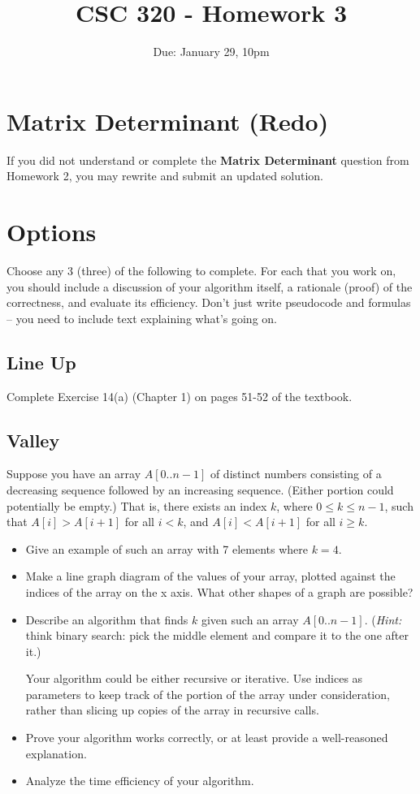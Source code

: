 \documentclass[12pt]{article}
\title{CSC 320 - Homework 3}
\author{}
\date{Due: January 29, 10pm}
\begin{document}
{\small \tableofcontents}

\section{Matrix Determinant (Redo)}

If you did not understand or complete the \textbf{Matrix Determinant} question from Homework 2, you may rewrite and submit an updated solution.

\section{Options}

Choose any 3 (three) of the following to complete. For each that you work on, you should include a discussion of your algorithm itself, a rationale (proof) of the correctness, and evaluate its efficiency. Don't just write pseudocode and formulas -- you need to include text explaining what's going on.

\subsection{Line Up}

Complete Exercise 14(a) (Chapter 1) on pages 51-52 of the textbook.

\subsection{Valley}

Suppose you have an array $A[0..n-1]$ of distinct numbers consisting of a decreasing sequence followed by an increasing sequence. (Either portion could potentially be empty.) That is, there exists an index $k$, where $0 \leq k \leq n-1$, such that $A[i] > A[i+1]$ for all $i < k$, and $A[i] < A[i+1]$ for all $i \geq k$.

\begin{itemize}
    \item Give an example of such an array with 7 elements where $k = 4$.
    
    \item Make a line graph diagram of the values of your array, plotted against the indices of the array on the x axis. What other shapes of a graph are possible?

    \item Describe an algorithm that finds $k$ given such an array $A[0..n-1]$. (\emph{Hint:} think binary search: pick the middle element and compare it to the one after it.)
    
    Your algorithm could be either recursive or iterative. Use indices as parameters to keep track of the portion of the array under consideration, rather than slicing up copies of the array in recursive calls.

    \item Prove your algorithm works correctly, or at least provide a well-reasoned explanation.

    \item Analyze the time efficiency of your algorithm.
\end{itemize}
\end{document}
